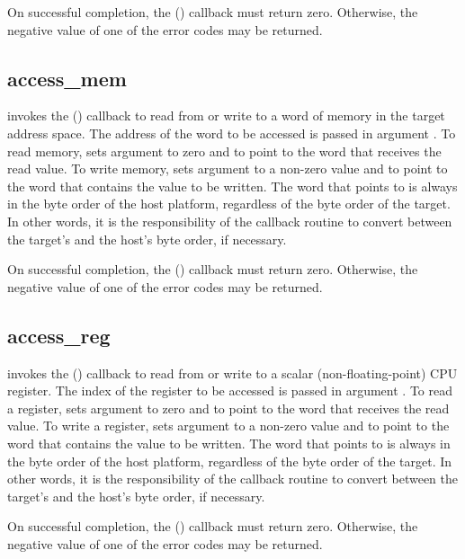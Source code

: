 \documentclass{article}
\begin{document}
On successful completion, the ()
callback must return zero.  Otherwise, the negative value of one of
the  error codes may be returned.

\subsection{access\_mem}

 invokes the () callback to read
from or write to a word of memory in the target address space.  The
address of the word to be accessed is passed in argument .
To read memory,  sets argument  to zero and
 to point to the word that receives the read value.  To
write memory,  sets argument  to a non-zero
value and  to point to the word that contains the value to
be written.  The word that  points to is always in the
byte order of the host platform, regardless of the byte order of the
target.  In other words, it is the responsibility of the callback
routine to convert between the target's and the host's byte order, if
necessary.

On successful completion, the ()
callback must return zero.  Otherwise, the negative value of one of
the  error codes may be returned.

\subsection{access\_reg}

 invokes the () callback to read
from or write to a scalar (non-floating-point) CPU register.  The
index of the register to be accessed is passed in argument
.  To read a register,  sets argument
 to zero and  to point to the word that receives
the read value.  To write a register,  sets argument
 to a non-zero value and  to point to the word
that contains the value to be written.  The word that 
points to is always in the byte order of the host platform, regardless
of the byte order of the target.  In other words, it is the
responsibility of the callback routine to convert between the
target's and the host's byte order, if necessary.

On successful completion, the () callback must
return zero.  Otherwise, the negative value of one of the
 error codes may be returned.
\end{document}

